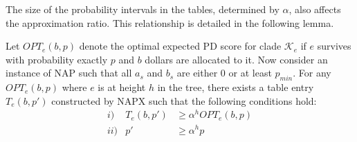 \documentclass[10pt]{llncs}       \usepackage{graphicx,subfigure}
\begin{document}
The size of the probability intervals in the tables, determined by 
 $\alpha$, also affects the approximation ratio.  This relationship
is detailed in the following lemma.  
\begin{lemma}
\label{lem:rounding}
Let $OPT_e(b,p)$ denote
the optimal expected PD score for clade $\mathcal{K}_e$
if $e$ survives with 
probability exactly $p$ and $b$ dollars are allocated to it.
Now consider an instance of NAP such that all $a_s$ and $b_s$ are either 0 or 
at least $p_{min}$. For any $OPT_e(b,p)$ where $e$ is at height $h$ in
the tree, there exists a table entry $T_e(b,p')$
constructed by NAPX such that the following conditions hold:
\begin{eqnarray*}
i)& T_e(b,p') &\geq \alpha^hOPT_e(b,p) \\
ii)& p' &\geq \alpha^hp
\end{eqnarray*}
\end{lemma}
\end{document}
